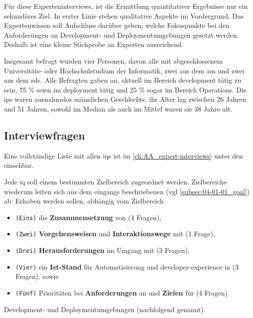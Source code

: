 Für diese Experteninterviews, ist die Ermittlung quantitativer Ergebnisse nur ein sekundäres Ziel. In erster Linie stehen qualitative Aspekte im Vordergrund. Das Expertenwissen soll Aufschluss darüber geben, welche Fokuspunkte bei den Anforderungen an Development- und Deploymentumgebungen gesetzt werden. Deshalb ist eine kleine Stichprobe an Experten ausreichend.

Insgesamt befragt wurden vier Personen, davon alle mit abgeschlossenem Universitäts- oder Hochschulstudium der Informatik, zwei aus dem \Gls{am} und zwei aus dem \Gls{sdc}. Alle Befragten gaben an, aktuell im Bereich \Gls{development} tätig zu sein, 75 \% seien im \Gls{deployment} tätig und 25 \% sogar im Bereich Operations. Die \Glspl{ip} waren ausnahmslos männlichen Geschlechts, ihr Alter lag zwischen 26 Jahren und 51 Jahren, sowohl im Median als auch im Mittel waren sie 38 Jahre alt.

\subsection{Interviewfragen}
\label{subsec:04-01-03_interview-questions}

Eine vollständige Liste mit allen \Glspl{iq} ist im \autoref{ch:AA_expert-interviews} unter den  einsehbar.

Jede \acrfull{iq} soll einem bestimmten Zielbereich zugeordnet werden. Zielbereiche wiederum leiten sich aus dem eingangs beschriebenen  (\acrshort{vgl} \autoref{subsec:04-01-01_goal}) ab. Erhoben werden sollen, abhängig vom Zielbereich

\begin{itemize}
    \item \texttt{(Eins)} die \textbf{Zusammensetzung} von (4 Fragen),
    \item \texttt{(Zwei)} \textbf{Vorgehensweisen} und \textbf{Interaktionswege} mit (1 Frage),
    \item \texttt{(Drei)} \textbf{Herausforderungen} im Umgang mit (3 Fragen),
    \item \texttt{(Vier)} ein \textbf{Ist-Stand} für Automatisierung und \Gls{developer-experience} in (3 Fragen), sowie
    \item \texttt{(Fünf)} Prioritäten bei \textbf{Anforderungen} an und \textbf{Zielen} für (4 Fragen)
\end{itemize}

Development- und Deploymentumgebungen (nachfolgend  genannt).

